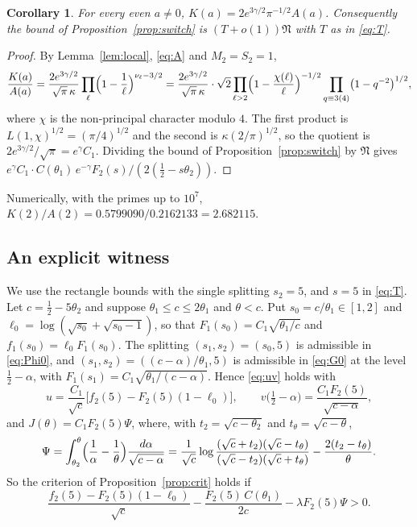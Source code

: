 \documentclass[11pt,a4paper]{amsart}
\newtheorem{corollary}[theorem]{Corollary}
\theoremstyle{remark}
\numberwithin{equation}{section}
\newcommand{\cN}{\mathfrak N}
\newcommand{\eg}{e^{\gamma}}
\begin{document}
\begin{corollary}\label{cor:KA}
For every even $a\ne0$, $K(a)=2e^{3\gamma/2}\pi^{-1/2}A(a)$. Consequently the bound of
Proposition~\ref{prop:switch} is $(T+o(1))\cN$ with $T$ as in \eqref{eq:T}.
\end{corollary}
\begin{proof}
By Lemma~\ref{lem:local}, \eqref{eq:A} and $M_2=S_2=1$,
\[
\frac{K(a)}{A(a)}=\frac{2e^{3\gamma/2}}{\sqrt\pi\,\kappa}\prod_\ell\Bigl(1-\frac1\ell\Bigr)^{\nu_\ell-3/2}
=\frac{2e^{3\gamma/2}}{\sqrt\pi\,\kappa}\cdot\sqrt2\prod_{\ell>2}\Bigl(1-\frac{\chi(\ell)}\ell\Bigr)^{-1/2}
\prod_{q\equiv3(4)}\bigl(1-q^{-2}\bigr)^{1/2},
\]
where $\chi$ is the non-principal character modulo $4$. The first product is $L(1,\chi)^{1/2}=(\pi/4)^{1/2}$ and
the second is $\kappa(2/\pi)^{1/2}$, so the quotient is $2e^{3\gamma/2}/\sqrt\pi=\eg C_1$. Dividing the bound of
Proposition~\ref{prop:switch} by $\cN$ gives $\eg C_1\cdot C(\theta_1)\,e^{-\gamma}F_2(s)/(2(\frac12-s\theta_2))$.
\end{proof}
Numerically, with the primes up to $10^7$, $K(2)/A(2)=0.5799090/0.2162133=2.682115$.

\subsection{An explicit witness}
We use the rectangle bounds with the single splitting $s_2=5$, and $s=5$ in \eqref{eq:T}. Let
$c=\frac12-5\theta_2$ and suppose $\theta_1\le c\le2\theta_1$ and $\theta<c$. Put $s_0=c/\theta_1\in[1,2]$ and
$\ell_0=\log(\sqrt{s_0}+\sqrt{s_0-1})$, so that $F_1(s_0)=C_1\sqrt{\theta_1/c}$ and $f_1(s_0)=\ell_0F_1(s_0)$. The
splitting $(s_1,s_2)=(s_0,5)$ is admissible in \eqref{eq:Phi0}, and $(s_1,s_2)=((c-\alpha)/\theta_1,5)$ is
admissible in \eqref{eq:G0} at the level $\frac12-\alpha$, with $F_1(s_1)=C_1\sqrt{\theta_1/(c-\alpha)}$. Hence
\eqref{eq:uv} holds with
\[
u=\frac{C_1}{\sqrt c}\bigl[f_2(5)-F_2(5)(1-\ell_0)\bigr],\qquad v\bigl(\tfrac12-\alpha\bigr)=\frac{C_1F_2(5)}{\sqrt{c-\alpha}},
\]
and $J(\theta)=C_1F_2(5)\Psi$, where, with $t_2=\sqrt{c-\theta_2}$ and $t_\theta=\sqrt{c-\theta}$,
\[
\Psi=\int_{\theta_2}^{\theta}\Bigl(\frac1\alpha-\frac1\theta\Bigr)\frac{d\alpha}{\sqrt{c-\alpha}}
=\frac1{\sqrt c}\log\frac{(\sqrt c+t_2)(\sqrt c-t_\theta)}{(\sqrt c-t_2)(\sqrt c+t_\theta)}-\frac{2(t_2-t_\theta)}{\theta} .
\]
So the criterion of Proposition~\ref{prop:crit} holds if
\begin{equation}\label{eq:witness}
\frac{f_2(5)-F_2(5)(1-\ell_0)}{\sqrt c}-\frac{F_2(5)\,C(\theta_1)}{2c}-\lambda F_2(5)\Psi>0 .
\end{equation}
\end{document}
